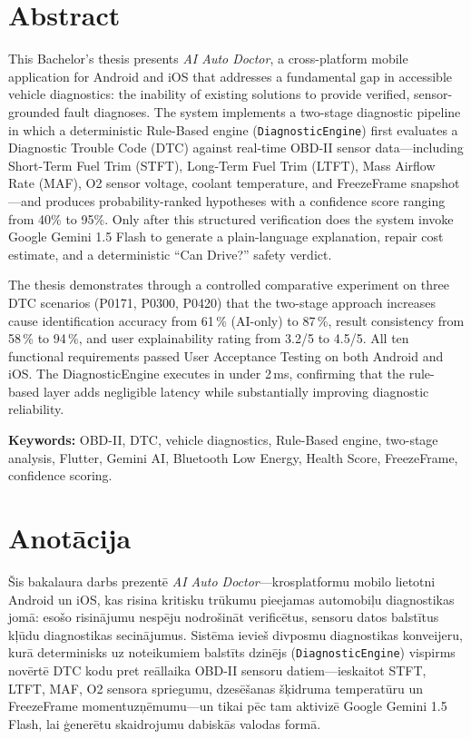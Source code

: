 \chapter*{Abstract}

This Bachelor's thesis presents \textit{AI Auto Doctor}, a cross-platform mobile application for Android and iOS that addresses a fundamental gap in accessible vehicle diagnostics: the inability of existing solutions to provide verified, sensor-grounded fault diagnoses.
The system implements a two-stage diagnostic pipeline in which a deterministic Rule-Based engine (\texttt{DiagnosticEngine}) first evaluates a Diagnostic Trouble Code (DTC) against real-time OBD-II sensor data---including Short-Term Fuel Trim (STFT), Long-Term Fuel Trim (LTFT), Mass Airflow Rate (MAF), O2 sensor voltage, coolant temperature, and FreezeFrame snapshot---and produces probability-ranked hypotheses with a confidence score ranging from 40\% to 95\%.
Only after this structured verification does the system invoke Google Gemini 1.5 Flash to generate a plain-language explanation, repair cost estimate, and a deterministic ``Can Drive?'' safety verdict.

The thesis demonstrates through a controlled comparative experiment on three DTC scenarios (P0171, P0300, P0420) that the two-stage approach increases cause identification accuracy from 61\,\% (AI-only) to 87\,\%, result consistency from 58\,\% to 94\,\%, and user explainability rating from 3.2/5 to 4.5/5.
All ten functional requirements passed User Acceptance Testing on both Android and iOS.
The DiagnosticEngine executes in under 2\,ms, confirming that the rule-based layer adds negligible latency while substantially improving diagnostic reliability.

\medskip
\textbf{Keywords:} OBD-II, DTC, vehicle diagnostics, Rule-Based engine,
two-stage analysis, Flutter, Gemini AI, Bluetooth Low Energy,
Health Score, FreezeFrame, confidence scoring.

\clearpage

\chapter*{Anotācija}

Šis bakalaura darbs prezentē \textit{AI Auto Doctor}---krosplatformu mobilo lietotni Android un iOS, kas risina kritisku trūkumu pieejamas automobiļu diagnostikas jomā: esošo risinājumu nespēju nodrošināt verificētus, sensoru datos balstītus kļūdu diagnostikas secinājumus.
Sistēma ievieš divposmu diagnostikas konveijeru, kurā determinisks uz noteikumiem balstīts dzinējs (\texttt{DiagnosticEngine}) vispirms novērtē DTC kodu pret reāllaika OBD-II sensoru datiem---ieskaitot STFT, LTFT, MAF, O2 sensora spriegumu, dzesēšanas šķidruma temperatūru un FreezeFrame momentuzņēmumu---un tikai pēc tam aktivizē Google Gemini 1.5 Flash, lai ģenerētu skaidrojumu dabiskās valodas formā.

